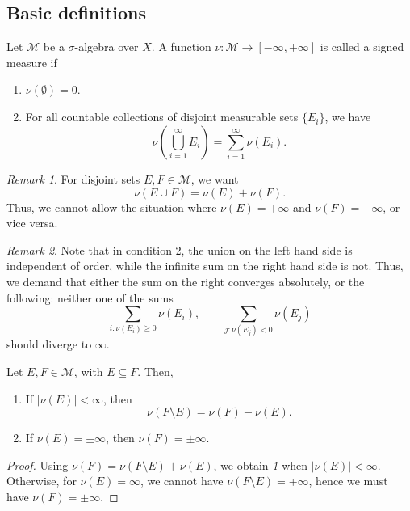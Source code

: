 \documentclass[11pt]{article}
\newcommand{\M}{\mathcal{M}}
\theoremstyle{definition}
\theoremstyle{remark}
\newtheorem*{remark}{Remark}
\begin{document}
    \subsection{Basic definitions}

    \begin{definition}
        Let $\M$ be a $\sigma$-algebra over $X$. A function $\nu\colon \M \to
        [-\infty, +\infty]$ is called a signed measure if \begin{enumerate}
            \itemsep0em
            \item $\nu(\emptyset) = 0$.
            \item For all countable collections of disjoint measurable sets
            $\{E_i\}$, we have \[
                \nu\left(\bigcup_{i = 1}^\infty E_i\right) = \sum_{i = 1}^\infty
                \nu(E_i).
            \]
        \end{enumerate}
        \begin{remark}
            For disjoint sets $E, F \in \M$, we want \[
                \nu(E \cup F) = \nu(E) + \nu(F).
            \] Thus, we cannot allow the situation where $\nu(E) = +\infty$ and
            $\nu(F) = -\infty$, or vice versa.
        \end{remark}
        \begin{remark}
            Note that in condition 2, the union on the left hand side is independent
            of order, while the infinite sum on the right hand side is not. Thus, we
            demand that either the sum on the right converges absolutely, or the
            following: neither one of the sums \[
                \sum_{i: \nu(E_i) \geq 0} \nu(E_i), \qquad
                \sum_{j: \nu(E_j) < 0} \nu(E_j)
            \] should diverge to $\infty$.
        \end{remark}
    \end{definition}

    \begin{lemma}
        Let $E, F \in \M$, with $E \subseteq F$. Then, \begin{enumerate}
            \item If $|\nu(E)| < \infty$, then \[
                \nu(F\setminus E) = \nu(F) - \nu(E).
            \]
            \item If $\nu(E) = \pm\infty$, then $\nu(F) = \pm\infty$.
        \end{enumerate}
    \end{lemma}
    \begin{proof}
        Using $\nu(F) = \nu(F\setminus E) + \nu(E)$, we obtain \emph{1} when
        $|\nu(E)| < \infty$. Otherwise, for $\nu(E) = \infty$, we cannot have
        $\nu(F\setminus E) = \mp\infty$, hence we must have $\nu(F) = \pm \infty$.
    \end{proof}
\end{document}
